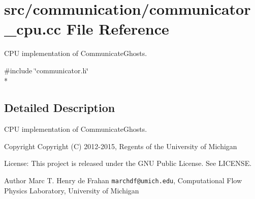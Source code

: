 \section{src/communication/communicator\-\_\-cpu.cc File Reference}
\label{communicator__cpu_8cc}


C\-P\-U implementation of Communicate\-Ghosts.  


{\ttfamily \#include \char`\"{}communicator.\-h\char`\"{}}\\*


\subsection{Detailed Description}
C\-P\-U implementation of Communicate\-Ghosts. \begin{DoxyCopyright}{Copyright}
Copyright (C) 2012-\/2015, Regents of the University of Michigan 
\end{DoxyCopyright}
\begin{DoxyParagraph}{License\-:}
This project is released under the G\-N\-U Public License. See L\-I\-C\-E\-N\-S\-E. 
\end{DoxyParagraph}
\begin{DoxyAuthor}{Author}
Marc T. Henry de Frahan {\tt marchdf@umich.\-edu}, Computational Flow Physics Laboratory, University of Michigan 
\end{DoxyAuthor}
